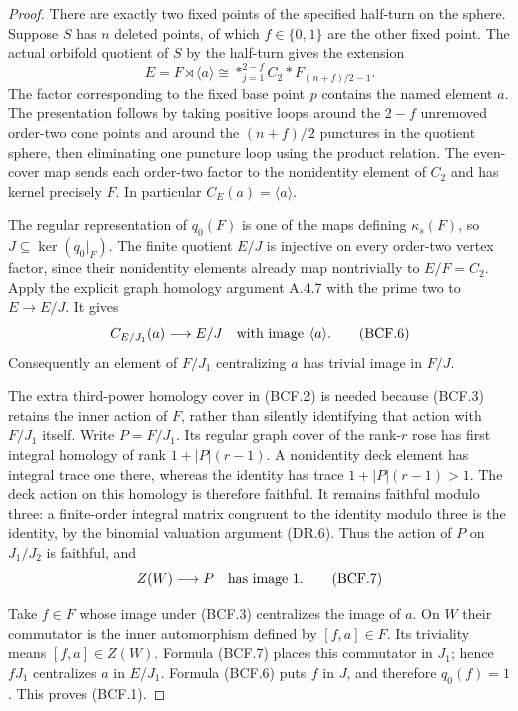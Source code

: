 \begin{proof}
There are exactly two fixed points of the specified half-turn
on the sphere.  Suppose $S$ has $n$ deleted points, of which
$f\in\{0,1\}$ are the other fixed point.  The actual orbifold
quotient of $S$ by the half-turn gives the extension
\[
 E=F\rtimes\langle a\rangle
       \cong\mathop{*}_{j=1}^{2-f}C_2
                     *F_{(n+f)/2-1}.                  \tag{BCF.5}
\]
The factor corresponding to the fixed base point $p$ contains
the named element $a$.  The presentation follows by taking
positive loops around the $2-f$ unremoved order-two cone
points and around the $(n+f)/2$ punctures in the quotient
sphere, then eliminating one puncture loop using the product
relation.  The even-cover map sends each order-two factor
to the nonidentity element of $C_2$ and has kernel precisely
$F$.  In particular $C_E(a)=\langle a\rangle$.

The regular representation of $q_0(F)$ is one of the maps
defining $\kappa_s(F)$, so $J\subseteq\ker(q_0|_F)$.
The finite quotient $E/J$ is injective on every order-two
vertex factor, since their nonidentity elements already
map nontrivially to $E/F=C_2$.  Apply the explicit graph
homology argument A.4.7 with the prime two to
$E\to E/J$.  It gives
\[
 C_{E/J_1}(a)\longrightarrow E/J
                     \quad\hbox{with image }\langle a\rangle.
                                                               \tag{BCF.6}
\]
Consequently an element of $F/J_1$ centralizing $a$ has
trivial image in $F/J$.

The extra third-power homology cover in (BCF.2) is needed
because (BCF.3) retains the inner action of $F$, rather than
silently identifying that action with $F/J_1$ itself.
Write $P=F/J_1$.  Its regular graph cover of the rank-$r$
rose has first integral homology of rank $1+|P|(r-1)$.
A nonidentity deck element has integral trace one there,
whereas the identity has trace $1+|P|(r-1)>1$.
The deck action on this homology is therefore faithful.
It remains faithful modulo three: a finite-order integral
matrix congruent to the identity modulo three is the
identity, by the binomial valuation argument (DR.6).
Thus the action of $P$ on $J_1/J_2$ is faithful, and
\[
                    Z(W)\longrightarrow P
                          \quad\hbox{has image }1.     \tag{BCF.7}
\]

Take $f\in F$ whose image under (BCF.3) centralizes the
image of $a$.  On $W$ their commutator is the inner
automorphism defined by $[f,a]\in F$.  Its triviality means
$[f,a]\in Z(W)$.  Formula (BCF.7) places this commutator
in $J_1$; hence $fJ_1$ centralizes $a$ in $E/J_1$.
Formula (BCF.6) puts $f$ in $J$, and therefore $q_0(f)=1$.
This proves (BCF.1).


\end{proof}
